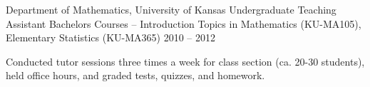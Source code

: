 \begin{cventries}
\cvteachentry
  	{Department of Mathematics, University of Kansas} %
  	{Undergraduate Teaching Assistant} %
    {Bachelors Courses -- Introduction Topics in Mathematics (KU-MA105), Elementary Statistics (KU-MA365)} %
    {2010 – 2012} %
    {
      \begin{cvitems} %
        \item Conducted tutor sessions three times a week for class section (ca. 20-30 students), held office hours, and graded tests, quizzes, and homework.
      \end{cvitems}
    } %
    {} %
    {\showteachingdescriptions}

\end{cventries}
